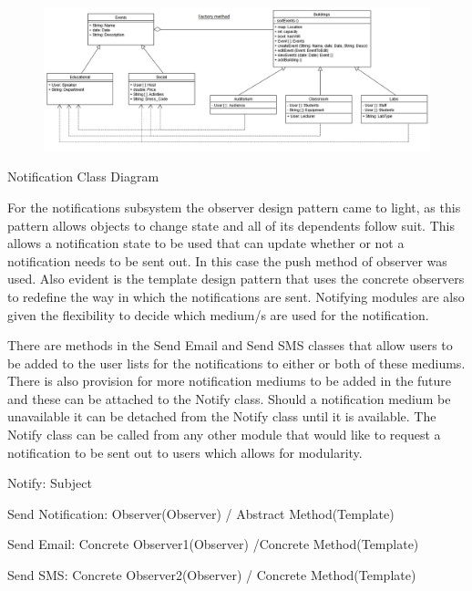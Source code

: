 \documentclass{article}
\begin{document}
    \mbox{}\\
    \bigskip
    \clearpage
    
    \begin{figure}[h!]
      \includegraphics[width=\textwidth]{Images/ClassDiagramEvents.png}
    \end{figure}
    Notification Class Diagram
    
    \begin{flushleft}
    
        For the notifications subsystem the observer design pattern came to light, as this pattern allows objects to change state and all of its dependents follow suit. This allows a notification state to be used that can update whether or not a notification needs to be sent out. In this case the push method of observer was used. Also evident is the template design pattern that uses the concrete observers to redefine the way in which the notifications are sent. Notifying modules are also given the flexibility to decide which medium/s are used for the notification.
        
        \bigskip
        
        There are methods in the Send Email and Send SMS classes that allow users to be added to the user lists for the notifications to either or both of these mediums. There is also provision for more notification mediums to be added in the future and these can be attached to the Notify class. Should a notification medium be unavailable it can be detached from the Notify class until it is available. The Notify class can be called from any other module that would like to request a notification to be sent out to users which allows for modularity.
        
        \bigskip
        Notify: Subject
        
        Send Notification: Observer(Observer) / Abstract Method(Template)
        
        Send Email: Concrete Observer1(Observer) /Concrete Method(Template)
        
        Send SMS: Concrete Observer2(Observer) / Concrete Method(Template)
    
    \end{flushleft}
    
\end{document}
